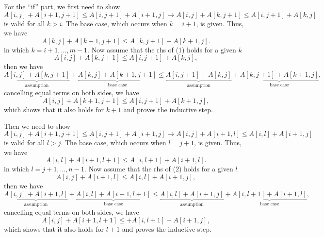 \documentclass{report}
\makeatletter
\renewenvironment{framed}{%
 \def\FrameCommand##1{\hskip\@totalleftmargin
 \fboxsep=\FrameSep\fbox{##1}}%
 \MakeFramed {\advance\hsize-\width
   \@totalleftmargin\z@ \linewidth\hsize
   \@setminipage}}%
 {\par\unskip\endMakeFramed}
\makeatother
\begin{document}
\begin{enumerate}
\begin{framed}
\begin{enumerate}
      For the ``if'' part, we first need to show
      \begin{equation}
        A[i, j] + A[i + 1, j + 1] \le A[i, j + 1] + A[i + 1, j] \rightarrow A[i, j] + A[k, j + 1] \le A[i, j + 1] + A[k, j]
        \label{eq:p_4_6}
      \end{equation}
      is valid for all $k > i$. The base case, which occurs when $k = i + 1$, is
      given. Thus, we have
      \[
        A[k, j] + A[k + 1, j + 1] \le A[k, j + 1] + A[k + 1, j].
      \]
      in which $k = i + 1, \dots, m - 1$. Now assume that the rhs of (1) holds for a given $k$
      \[
        A[i, j] + A[k, j + 1] \le A[i, j + 1] + A[k, j],
      \]
      then we have
      \[
        \underbrace{A[i, j] + A[k, j + 1]}_\text{assumption} +
        \underbrace{A[k, j] + A[k + 1, j + 1]}_\text{base case} \le
        \underbrace{A[i, j + 1] + A[k, j]}_\text{assumption} +
        \underbrace{A[k, j + 1] + A[k + 1, j]}_\text{base case},
      \]
      cancelling equal terms on both sides, we have
      \[
        A[i, j] + A[k + 1, j + 1] \le A[i, j + 1] + A[k + 1, j],
      \]
      which shows that it also holds for $k + 1$ and proves the inductive step.

      Then we need to show
      \begin{equation}
        A[i, j] + A[i + 1, j + 1] \le A[i, j + 1] + A[i + 1, j] \rightarrow A[i, j] + A[i + 1, l] \le A[i, l] + A[i + 1, j]
      \end{equation}
      is valid for all $l > j$. The base case, which occurs when $l = j + 1$, is
      given. Thus, we have
      \[
        A[i, l] + A[i + 1, l + 1] \le A[i, l + 1] + A[i + 1, l].
      \]
      in which $l = j + 1, \dots, n - 1$. Now assume that the rhs of (2) holds for a given $l$
      \[
        A[i, j] + A[i + 1, l] \le A[i, l] + A[i + 1, j],
      \]
      then we have
      \[
        \underbrace{A[i, j] + A[i + 1, l]}_\text{assumption} +
        \underbrace{A[i, l] + A[i + 1, l + 1]}_\text{base case} \le
        \underbrace{A[i, l] + A[i + 1, j]}_\text{assumption} +
        \underbrace{A[i, l + 1] + A[i + 1, l]}_\text{base case},
      \]
      cancelling equal terms on both sides, we have
      \[
        A[i, j] + A[i + 1, l + 1] \le  + A[i, l + 1] + A[i + 1, j],
      \]
      which shows that it also holds for $l + 1$ and proves the inductive step.


\end{enumerate}
\end{framed}
\end{enumerate}
\end{document}
